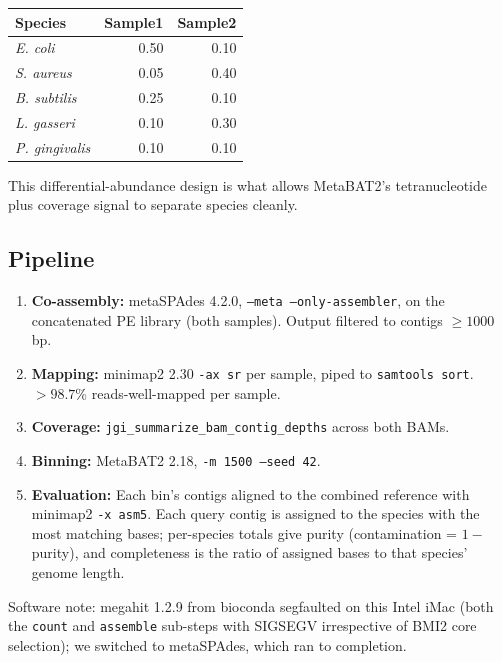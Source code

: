 \documentclass[11pt]{article}
\begin{document}
\begin{center}
\begin{tabular}{lrr}
\toprule
Species & Sample1 & Sample2 \\
\midrule
\emph{E. coli}         & 0.50 & 0.10 \\
\emph{S. aureus}       & 0.05 & 0.40 \\
\emph{B. subtilis}     & 0.25 & 0.10 \\
\emph{L. gasseri}      & 0.10 & 0.30 \\
\emph{P. gingivalis}   & 0.10 & 0.10 \\
\bottomrule
\end{tabular}
\end{center}

This differential-abundance design is what allows MetaBAT2's tetranucleotide
plus coverage signal to separate species cleanly.

\subsection{Pipeline}

\begin{enumerate}
  \item \textbf{Co-assembly:} metaSPAdes 4.2.0, \texttt{--meta --only-assembler},
  on the concatenated PE library (both samples). Output filtered to contigs
  $\geq 1000$\,bp.
  \item \textbf{Mapping:} minimap2 2.30 \texttt{-ax sr} per sample, piped to
  \texttt{samtools sort}. $>98.7\%$ reads-well-mapped per sample.
  \item \textbf{Coverage:} \texttt{jgi\_summarize\_bam\_contig\_depths} across
  both BAMs.
  \item \textbf{Binning:} MetaBAT2 2.18, \texttt{-m 1500 --seed 42}.
  \item \textbf{Evaluation:} Each bin's contigs aligned to the combined
  reference with minimap2 \texttt{-x asm5}. Each query contig is assigned to
  the species with the most matching bases; per-species totals give purity
  (contamination = $1 - $ purity), and completeness is the ratio of assigned
  bases to that species' genome length.
\end{enumerate}

Software note: megahit 1.2.9 from bioconda segfaulted on this Intel iMac (both
the \texttt{count} and \texttt{assemble} sub-steps with SIGSEGV irrespective of
BMI2 core selection); we switched to metaSPAdes, which ran to completion.
\end{document}
